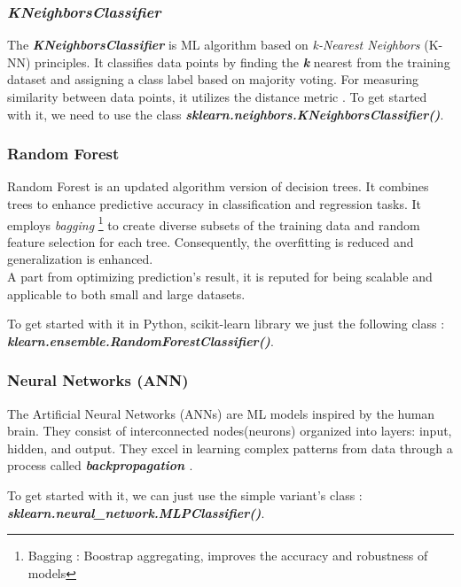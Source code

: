 \documentclass[12pt,a4paper, oneside]{book}
\begin{document}
\subsubsection{\textit{KNeighborsClassifier}}
The \textbf{\textit{KNeighborsClassifier}} is ML algorithm based on \textit{k-Nearest Neighbors} (K-NN) principles. It classifies data points by finding the \textbf{\textit{k}} nearest from the training dataset and assigning a class label based on majority voting. For measuring similarity between data points, it utilizes the distance metric \cite{nayak2022study}. 
To get started with it, we need to use the class\textbf{ \textit{sklearn.neighbors.KNeighborsClassifier()}}. 

\subsubsection{Random Forest}
Random Forest is an updated algorithm version of  decision trees. It combines trees to enhance predictive accuracy in classification and regression tasks. It employs \textit{bagging} \footnote{Bagging : Boostrap aggregating, improves the accuracy and robustness of models}  to create diverse subsets of the training data and random feature selection for each tree\cite{lin2017ensemble}. Consequently, the overfitting is reduced and generalization is enhanced. \\

A part from optimizing prediction's result, it is reputed for being scalable and applicable to both small and large datasets. 

To get started with it in Python, scikit-learn library we just the following class : \newline \textbf{\textit{klearn.ensemble.RandomForestClassifier()}}. 
\subsubsection{Neural Networks (ANN)}
The Artificial Neural Networks (ANNs) are ML models inspired by the human brain. They consist of interconnected nodes(neurons) \cite{boateng2020basic} organized into layers: input, hidden, and output. They excel in learning complex patterns from data through a process called \textbf{\textit{backpropagation} \cite{lillicrap2020backpropagation}}. 

To get started with it, we can just use the simple variant's class : \newline \textit{\textbf{sklearn.neural\_network.MLPClassifier()}}.
\end{document}
